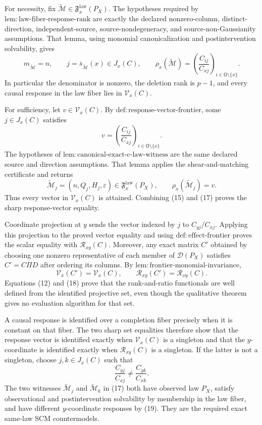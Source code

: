 For necessity, fix \(\widetilde{\mathcal M}\in\mathfrak F_x^{\mathrm{law}}(P_X)\). The hypotheses required by \(\mathrm{lem:law\text{-}fiber\text{-}response\text{-}rank}\) are exactly the declared nonzero-column, distinct-direction, independent-source, source-nondegeneracy, and source-non-Gaussianity assumptions. That lemma, using monomial canonicalization and postintervention solvability, gives
\[
 m_{\widetilde{\mathcal M}}=n,
 \qquad j=\bar s_{\widetilde{\mathcal M}}(x)\in J_x(C),
 \qquad
 \rho_x(\widetilde{\mathcal M})
 =\left(\frac{C_{ij}}{C_{xj}}\right)_{i\in\mathsf O\setminus\{x\}}. \tag{15}
\]
In particular the denominator is nonzero, the deletion rank is \(p-1\), and every causal response in the law fiber lies in \(\mathcal V_x(C)\).

For sufficiency, let \(v\in\mathcal V_x(C)\). By \(\mathrm{def:response\text{-}vector\text{-}frontier}\), some \(j\in J_x(C)\) satisfies
\[
 v=\left(\frac{C_{ij}}{C_{xj}}\right)_{i\in\mathsf O\setminus\{x\}}. \tag{16}
\]
The hypotheses of \(\mathrm{lem:canonical\text{-}exact\text{-}c\text{-}law\text{-}witness}\) are the same declared source and direction assumptions. That lemma applies the shear-and-matching certificate and returns
\[
 \widetilde{\mathcal M}_j=(n,Q_j,H_j,\varepsilon)
 \in\mathfrak F_x^{\mathrm{law}}(P_X),
 \qquad
 \rho_x(\widetilde{\mathcal M}_j)=v. \tag{17}
\]
Thus every vector in \(\mathcal V_x(C)\) is attained. Combining (15) and (17) proves the sharp response-vector equality.

Coordinate projection at \(y\) sends the vector indexed by \(j\) to \(C_{yj}/C_{xj}\). Applying this projection to the proved vector equality and using \(\mathrm{def:effect\text{-}frontier}\) proves the scalar equality with \(\mathcal R_{xy}(C)\). Moreover, any exact matrix \(C'\) obtained by choosing one nonzero representative of each member of \(\mathcal D(P_X)\) satisfies \(C'=C\Pi D\) after ordering its columns. By \(\mathrm{lem:frontier\text{-}monomial\text{-}invariance}\),
\[
 \mathcal V_x(C')=\mathcal V_x(C),
 \qquad
 \mathcal R_{xy}(C')=\mathcal R_{xy}(C). \tag{18}
\]
Equations (12) and (18) prove that the rank-and-ratio functionals are well defined from the identified projective set, even though the qualitative theorem gives no evaluation algorithm for that set.

A causal response is identified over a completion fiber precisely when it is constant on that fiber. The two sharp set equalities therefore show that the response vector is identified exactly when \(\mathcal V_x(C)\) is a singleton and that the \(y\)-coordinate is identified exactly when \(\mathcal R_{xy}(C)\) is a singleton. If the latter is not a singleton, choose \(j,k\in J_x(C)\) such that
\[
 \frac{C_{yj}}{C_{xj}}\ne\frac{C_{yk}}{C_{xk}}. \tag{19}
\]
The two witnesses \(\widetilde{\mathcal M}_j\) and \(\widetilde{\mathcal M}_k\) in (17) both have observed law \(P_X\), satisfy observational and postintervention solvability by membership in the law fiber, and have different \(y\)-coordinate responses by (19). They are the required exact same-law SCM countermodels.

